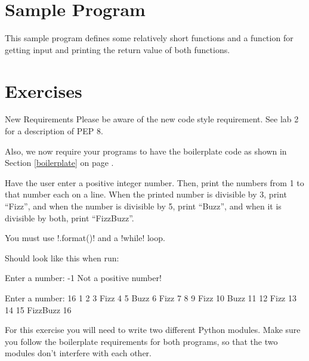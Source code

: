 \documentclass[11pt]{cselabheader}
\begin{document}
{{\section{Sample Program}

This sample program defines some relatively short functions and a
 function for getting input and printing the return value
of both functions.



\newpage
\section{Exercises}\label{exercises}

\begin{warningbox}{New Requirements}
  Please be aware of the new code style requirement. See lab 2 for a
  description of PEP 8.

  Also, we now require your programs to have the boilerplate code as shown
  in Section \ref{boilerplate} on page \pageref{boilerplate}.
\end{warningbox}


\begin{ex}[fizzbuzz.py] Have the user enter a positive integer number. Then,
  print the numbers from 1 to that number each on a line. When the printed
  number is divisible by 3, print ``Fizz'', and when the number is divisible by
  5, print ``Buzz'', and when it is divisible by both, print ``FizzBuzz''.

  You must use \pythoninline!.format()! and a \pythoninline!while! loop.

  Should look like this when run:

  \begin{verbatimcode}
Enter a number: -1
Not a positive number!
  \end{verbatimcode}

  \begin{verbatimcode}
Enter a number: 16
1
2
3 Fizz
4
5 Buzz
6 Fizz
7
8
9 Fizz
10 Buzz
11
12 Fizz
13
14
15 FizzBuzz
16
  \end{verbatimcode}
\end{ex}

\begin{ex}
  For this exercise you will need to write two different Python modules. Make
  sure you follow the boilerplate requirements for both programs, so that the
  two modules don't interfere with each other.


\end{ex}}}
\end{document}
